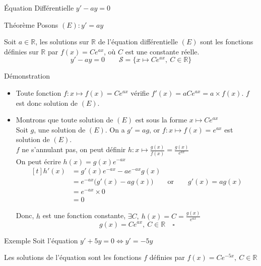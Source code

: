 \documentclass{cours}
\begin{document}
    \begin{Gpartie}{Équation Différentielle $y'-ay=0$} 
        \begin{Spartie}{Théorème} 
            Posons $(E) : y'=ay$

            Soit $a\in\mathbb{R}$, les solutions sur $\mathbb{R}$ de l'équation différentielle $(E)$ sont les fonctions définies sur $\mathbb{R}$ par $f(x)=Ce^{ax}$, où $C$ est une constante réelle.
            \[y'-ay=0\qquad \mathcal{S}=\big\{x\mapsto Ce^{ax},\ C\in\mathbb{R}\big\}\]

            \begin{SSpartie}{Démonstration} 
                \begin{itemize}
                    \item Toute fonction $f:x\mapsto f(x)=Ce^{ax}$ vérifie $f'(x)=aCe^{ax}=a\times f(x)$. $f$ est donc solution de $(E)$.
                    \item Montrons que toute solution de $(E)$ est sous la forme $x\mapsto Ce^{ax}$ \\
                    Soit $g$, une solution de $(E)$. On a $g'=ag$, or $f:x\mapsto f(x)=e^{ax}$ est solution de $(E)$. \\
                    $f$ ne s'annulant pas, on peut définir $h:x\mapsto \frac{g(x)}{f(x)}=\frac{g(x)}{e^{ax}}$ \\
                    On peut écrire $h(x)=g(x)e^{-ax}$
                    \[\begin{aligned}[t]
                        h'(x)&=g'(x)e^{-ax}-ae^{-ax}g(x) \\
                        &=e^{-ax}\big(g'(x)-ag(x)\big)\qquad\text{or}\qquad g'(x)=ag(x) \\
                        &=e^{-ax}\times 0 \\
                        &=0
                    \end{aligned}\]

                    Donc, $h$ est une fonction constante, $\exists C,\ h(x)=C=\frac{g(x)}{e^{ax}}$
                    \[g(x)=Ce^{ax},\ C\in\mathbb{R}\quad\square\]
                \end{itemize}
            \end{SSpartie}
            \begin{Spartie}{Exemple} 
                Soit l'équation $y'+5y=0\iff y'=-5y$

                Les solutions de l'équation sont les fonctions $f$ définies par $f(x)=Ce^{-5x},\ C\in\mathbb{R}$
            \end{Spartie}
        \end{Spartie}
    \end{Gpartie}
\end{document}
